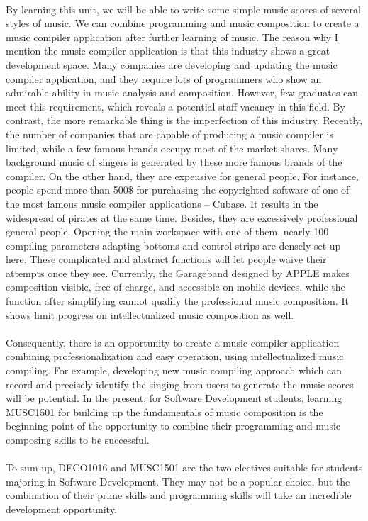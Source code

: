 \documentclass{article}
\begin{document}
	\\
	By learning this unit, we will be able to write some simple music scores of several styles of music. We can combine programming and music composition to create a music compiler application after further learning of music. The reason why I mention the music compiler application is that this industry shows a great development space. Many companies are developing and updating the music compiler application, and they require lots of programmers who show an admirable ability in music analysis and composition. However, few graduates can meet this requirement, which reveals a potential staff vacancy in this field. By contrast, the more remarkable thing is the imperfection of this industry. Recently, the number of companies that are capable of producing a music compiler is limited, while a few famous brands occupy most of the market shares. Many background music of singers is generated by these more famous brands of the compiler. On the other hand, they are expensive for general people. For instance, people spend more than 500\$ for purchasing the copyrighted software of one of the most famous music compiler applications -- Cubase. It results in the widespread of pirates at the same time. Besides, they are excessively professional general people. Opening the main workspace with one of them, nearly 100 compiling parameters adapting bottoms and control strips are densely set up here. These complicated and abstract functions will let people waive their attempts once they see. Currently, the Garageband designed by APPLE makes composition visible, free of charge, and accessible on mobile devices, while the function after simplifying cannot qualify the professional music composition. It shows limit progress on intellectualized music composition as well.\\
	\\
	Consequently, there is an opportunity to create a music compiler application combining professionalization and easy operation, using intellectualized music compiling. For example, developing new music compiling approach which can record and precisely identify the singing from users to generate the music scores will be potential. In the present, for Software Development students, learning MUSC1501 for building up the fundamentals of music composition is the beginning point of the opportunity to combine their programming and music composing skills to be successful. \\
	\\
	To sum up, DECO1016 and MUSC1501 are the two electives suitable for students majoring in Software Development. They may not be a popular choice, but the combination of their prime skills and programming skills will take an incredible development opportunity.\\
	\\
\end{document}
